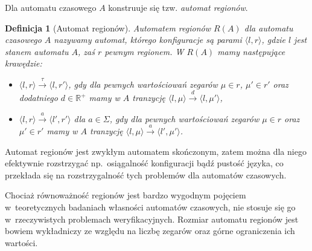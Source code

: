 \documentclass{pracamgr}
\newcommand{\pair}[2]{\langle #1, #2 \rangle}
\theoremstyle{plain}
\newtheorem{definition}{Definicja}
\begin{document}
Dla automatu czasowego $A$ konstruuje się tzw. \emph{automat
  regionów}.

\begin{definition}[Automat regionów]
  Automatem regionów $R(A)$ dla automatu czasowego $A$ nazywamy
  automat, którego konfiguracje są parami $\pair{l}{r}$, gdzie $l$
  jest stanem automatu $A$, zaś $r$ pewnym regionem. W $R(A)$ mamy
  następujące krawędzie:
  \begin{itemize}
    \item $\pair{l}{r} \stackrel{\tau}{\longrightarrow} \pair{l}{r'}$,
    gdy dla pewnych wartościowań zegarów $\mu\in r$, $\mu'\in r'$ oraz
    dodatniego $d\in\mathbb{R}^+$ mamy w $A$ tranzycję $\pair{l}{\mu}
    \stackrel{d}{\longrightarrow} \pair{l}{\mu'}$,
    \item $\pair{l}{r} \stackrel{a}{\longrightarrow} \pair{l'}{r'}$
    dla $a\in\Sigma$, gdy dla pewnych wartościowań
    zegarów $\mu\in r$ oraz $\mu'\in r'$ mamy w $A$ tranzycję
    $\pair{l}{\mu} \stackrel{a}{\longrightarrow} \pair{l'}{\mu'}$.
  \end{itemize}

\end{definition}

Automat regionów jest zwykłym automatem skończonym, zatem można dla
niego efektywnie rozstrzygać np.~osiągalność konfiguracji bądź
pustość języka, co przekłada się na rozstrzygalność tych problemów
dla automatów czasowych.

Chociaż równoważność regionów jest bardzo wygodnym pojęciem
w~teoretycznych badaniach własności automatów czasowych, nie stosuje się
go w~rzeczywistych problemach weryfikacyjnych. Rozmiar automatu
regionów jest bowiem wykładniczy ze względu na liczbę zegarów oraz
górne ograniczenia ich wartości.
\end{document}
